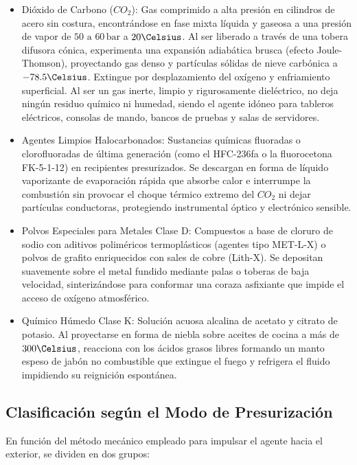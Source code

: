 \begin{itemize}
    \item Dióxido de Carbono ($CO_2$): Gas comprimido a alta presión en cilindros de acero sin costura, encontrándose en
          fase mixta líquida y gaseosa a una presión de vapor de $50\text{ a }60\,\mathrm{bar}$ a $20\Celsius$. Al ser
          liberado a través de una tobera difusora cónica, experimenta una expansión adiabática brusca (efecto
          Joule-Thomson), proyectando gas denso y partículas sólidas de nieve carbónica a $-78.5\Celsius$. Extingue por
          desplazamiento del oxígeno y enfriamiento superficial. Al ser un gas inerte, limpio y rigurosamente dieléctrico, no
          deja ningún residuo químico ni humedad, siendo el agente idóneo para tableros eléctricos, consolas de mando,
          bancos de pruebas y salas de servidores.
    \item Agentes Limpios Halocarbonados: Sustancias químicas fluoradas o clorofluoradas de última generación (como el
          HFC-236fa o la fluorocetona FK-5-1-12) en recipientes presurizados. Se descargan en forma de líquido vaporizante de
          evaporación rápida que absorbe calor e interrumpe la combustión sin provocar el choque térmico extremo del $CO_2$
          ni dejar partículas conductoras, protegiendo instrumental óptico y electrónico sensible.
    \item Polvos Especiales para Metales Clase D: Compuestos a base de cloruro de sodio con aditivos poliméricos
          termoplásticos (agentes tipo MET-L-X) o polvos de grafito enriquecidos con sales de cobre (Lith-X). Se depositan
          suavemente sobre el metal fundido mediante palas o toberas de baja velocidad, sinterizándose para conformar una
          coraza asfixiante que impide el acceso de oxígeno atmosférico.
    \item Químico Húmedo Clase K: Solución acuosa alcalina de acetato y citrato de potasio. Al proyectarse en forma de niebla
          sobre aceites de cocina a más de $300\Celsius$, reacciona con los ácidos grasos libres formando un manto espeso de
          jabón no combustible que extingue el fuego y refrigera el fluido impidiendo su reignición espontánea.
\end{itemize}

\subsection{Clasificación según el Modo de Presurización}

En función del método mecánico empleado para impulsar el agente hacia el exterior, se dividen en dos grupos:

